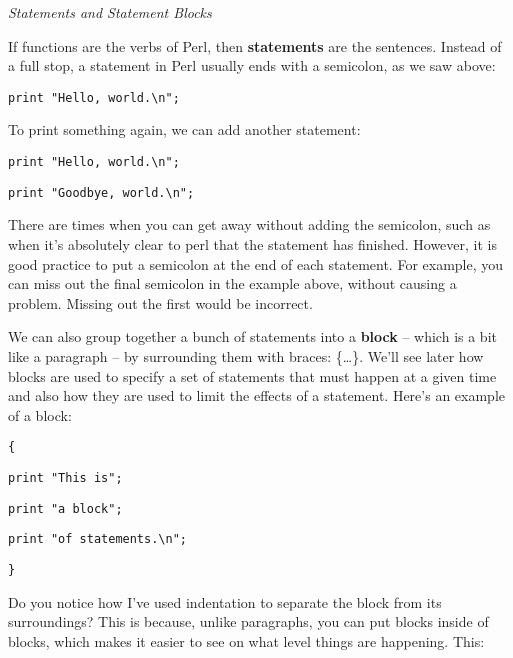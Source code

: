 \documentclass[a4paper,12pt,twoside]{book}
\begin{document}
\noindent 

\noindent \textit{Statements and Statement Blocks}

\noindent If functions are the verbs of Perl, then \textbf{statements }are the sentences. Instead of a full stop, a statement in Perl usually ends with a semicolon, as we saw above:

\noindent 

\noindent \texttt{print "Hello, world.\textbackslash n";}

\noindent 

\noindent To print something again, we can add another statement:

\noindent 

\noindent 

\noindent \texttt{print "Hello, world.\textbackslash n";}

\noindent \texttt{print "Goodbye, world.\textbackslash n";}

\noindent 

\noindent There are times when you can get away without adding the semicolon, such as when it's absolutely clear to perl that the statement has finished. However, it is good practice to put a semicolon at the end of each statement. For example, you can miss out the final semicolon in the example above, without causing a problem. Missing out the first would be incorrect.

\noindent 

\noindent We can also group together a bunch of statements into a \textbf{block }-- which is a bit like a paragraph -- by surrounding them with braces: \{\dots \}. We'll see later how blocks are used to specify a set of statements that must happen at a given time and also how they are used to limit the effects of a statement. Here's an example of a block:

\noindent 

\noindent \texttt{\{}

\noindent \texttt{print "This is";}

\noindent \texttt{print "a block";}

\noindent \texttt{print "of statements.\textbackslash n";}

\noindent \texttt{\}}

\noindent 

\noindent Do you notice how I've used indentation to separate the block from its surroundings? This is because, unlike paragraphs, you can put blocks inside of blocks, which makes it easier to see on what level things are happening. This:
\end{document}
